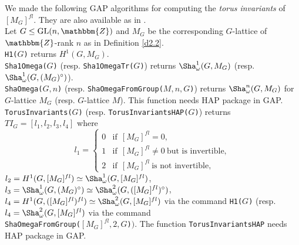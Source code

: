 \documentclass{amsart}
\theoremstyle{plain}
\theoremstyle{definition}
\theoremstyle{remark}
\newcommand{\bZ}{\mathbbm{Z}}\newcommand{\bQ}{\mathbbm{Q}}
\newcommand{\GL}{{\rm GL}}\newcommand{\SL}{{\rm SL}}
\begin{document}
We made the following GAP \cite{GAP} algorithms for computing 
the {\it torus invariants} of $[M_G]^{fl}$. 
They are also available as in \cite{BCAlgTori}.\\

Let $G\leq \GL(n,\bZ)$ 
and $M_G$ be the corresponding $G$-lattice of $\bZ$-rank $n$ 
as in Definition \ref{d2.2}.\\

\noindent 
{\tt H1($G$)} returns $H^1(G,M_G)$.\\

\noindent 
{\tt Sha1Omega($G$)} (resp. {\tt Sha1OmegaTr($G$)}) 
returns $\Sha^1_\omega(G,M_G)$ (resp. $\Sha^1_\omega(G,(M_G)^\circ)$).\\

\noindent 
{\tt ShaOmega($G,n$)} (resp. {\tt ShaOmegaFromGroup($M,n,G$)}) 
returns $\Sha^n_\omega(G,M_G)$ for $G$-lattice $M_G$ (resp. $G$-lattice $M$). 
This function needs HAP package \cite{HAP} in GAP.\\

\noindent 
{\tt TorusInvariants($G$)} 
(resp. {\tt TorusInvariantsHAP($G$)}) 
returns $TI_G=[l_1,l_2,l_3,l_4]$ 
where 
\[
l_1=\begin{cases}
0& \textrm{if}\ \ [M_G]^{fl}=0,\\
1& \textrm{if}\ \ [M_G]^{fl}\neq 0\ \textrm{but\ is\ invertible},\\
2& \textrm{if}\ \ [M_G]^{fl}\ \textrm{is\ not\ invertible},
\end{cases}\]
$l_2=H^1(G,[M_G]^{fl})\simeq \Sha^1_\omega(G,[M_G]^{fl})$, 
$l_3=\Sha^1_\omega(G,(M_G)^\circ)\simeq \Sha^2_\omega(G,([M_G]^{fl})^\circ)$, 
$l_4=H^1(G,([M_G]^{fl})^{fl})\simeq \Sha^2_\omega(G,[M_G]^{fl})$ 
via the command {\tt H1(}$G${\tt )} 
(resp. $l_4=\Sha^2_\omega(G,[M_G]^{fl})$ 
via the command\\
{\tt ShaOmegaFromGroup(}$[M_G]^{fl},2,G${\tt )}$)$. 
The function {\tt TorusInvariantsHAP} needs HAP package \cite{HAP} in GAP.\\
\end{document}
